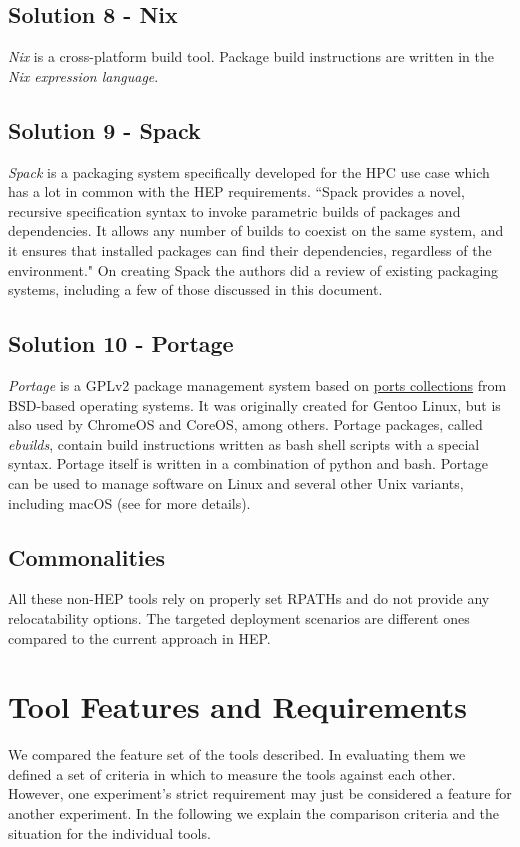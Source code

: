 \documentclass[12pt,a4paper]{article}
\begin{document}
\subsection{Solution 8 - Nix }
\emph{Nix}\cite{nix} is a cross-platform build tool. Package build instructions are written in the \emph{Nix expression language}.

\subsection{Solution 9 - Spack }
\emph{Spack}\cite{Spack} is a packaging system specifically developed for the HPC use case which has a lot in common with the HEP requirements.
``Spack provides a novel, recursive specification syntax to invoke parametric builds of packages and dependencies. It allows any number of builds to coexist on the same system, and it ensures that installed packages can find their dependencies, regardless of the environment." On creating Spack the authors did a review of existing packaging systems, including a few of those discussed in this document.

\subsection{Solution 10 - Portage }
\emph{Portage}\cite{portage} is a GPLv2 package management system
based on \href{https://en.wikipedia.org/wiki/Ports_collection}{ports collections} from BSD-based operating systems.
It was originally created for Gentoo Linux, but is also used by ChromeOS
and CoreOS, among others. Portage packages, called \emph{ebuilds},
contain build instructions written as bash shell scripts with a special
syntax. Portage itself is written in a combination of python and bash.
Portage can be used to manage software on Linux and several other Unix
variants, including macOS (see \cite{prefix} for more details).

\subsection{Commonalities}
All these non-HEP tools rely on properly set RPATHs and do not provide any relocatability options. The targeted deployment scenarios are  different ones compared to the current approach in HEP.

\section{Tool Features and Requirements}
We compared the feature set of the tools described. In evaluating them we
defined a set of criteria in which to measure the tools against each other.
However, one experiment's strict requirement may just be considered a feature
for another experiment. In the following we explain the comparison criteria and
the situation for the individual tools.
\end{document}

